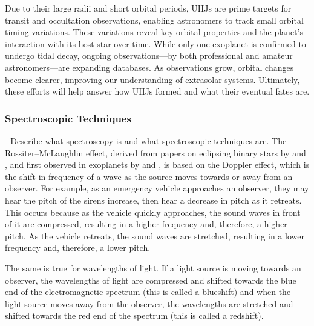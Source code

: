 \documentclass[oneside,12pt]{amsart}
\numberwithin{page}{section}
\begin{document}
Due to their large radii and short orbital periods, UHJs are prime targets for transit and occultation observations, enabling astronomers to track small orbital timing variations. These variations reveal key orbital properties and the planet’s interaction with its host star over time. While only one exoplanet is confirmed to undergo tidal decay, ongoing observations—by both professional and amateur astronomers—are expanding databases. As observations grow, orbital changes become clearer, improving our understanding of extrasolar systems. Ultimately, these efforts will help answer how UHJs formed and what their eventual fates are.


\subsubsection{Spectroscopic Techniques}\label{sec:obs-spec}
- Describe what spectroscopy is and what spectroscopic techniques are.
The Rossiter–McLaughlin effect, derived from papers on eclipsing binary stars by \citep{rossiter1924detection} and \citep{mclaughlin1924some}, and first observed in exoplanets by \citep{queloz2000detection} and \citep{bundy2000search}, is based on the Doppler effect, which is the shift in frequency of a wave as the source moves towards or away from an observer. For example, as an emergency vehicle approaches an observer, they may hear the pitch of the sirens increase, then hear a decrease in pitch as it retreats. This occurs because as the vehicle quickly approaches, the sound waves in front of it are compressed, resulting in a higher frequency and, therefore, a higher pitch. As the vehicle retreats, the sound waves are stretched, resulting in a lower frequency and, therefore, a lower pitch. 

The same is true for wavelengths of light. If a light source is moving towards an observer, the wavelengths of light are compressed and shifted towards the blue end of the electromagnetic spectrum (this is called a blueshift) and when the light source moves away from the observer, the wavelengths are stretched and shifted towards the red end of the spectrum (this is called a redshift).
\end{document}
